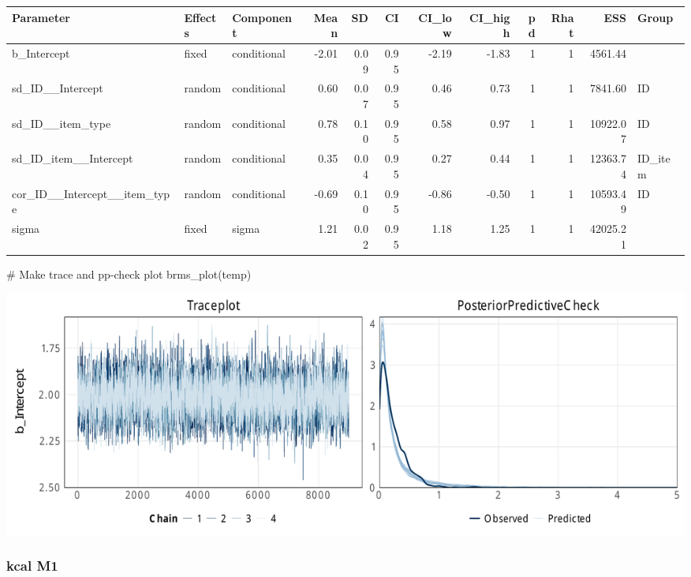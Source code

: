 \documentclass[
  letterpaper,
  DIV=11,
  numbers=noendperiod]{scrartcl}
\newenvironment{Shaded}{\begin{snugshade}}{\end{snugshade}}
\newcommand{\AttributeTok}[1]{\textcolor[rgb]{0.40,0.45,0.13}{#1}}
\newcommand{\CommentTok}[1]{\textcolor[rgb]{0.37,0.37,0.37}{#1}}
\newcommand{\FunctionTok}[1]{\textcolor[rgb]{0.28,0.35,0.67}{#1}}
\newcommand{\NormalTok}[1]{\textcolor[rgb]{0.00,0.23,0.31}{#1}}
\newcommand{\OtherTok}[1]{\textcolor[rgb]{0.00,0.23,0.31}{#1}}
\newcommand{\SpecialCharTok}[1]{\textcolor[rgb]{0.37,0.37,0.37}{#1}}
\newcommand{\StringTok}[1]{\textcolor[rgb]{0.13,0.47,0.30}{#1}}
\begin{document}
\begin{longtable*}[t]{lllrrrrrrrrl}
\toprule
Parameter & Effects & Component & Mean & SD & CI & CI\_low & CI\_high & pd & Rhat & ESS & Group\\
\midrule
b\_Intercept & fixed & conditional & -2.01 & 0.09 & 0.95 & -2.19 & -1.83 & 1 & 1 & 4561.44 & \\
sd\_ID\_\_Intercept & random & conditional & 0.60 & 0.07 & 0.95 & 0.46 & 0.73 & 1 & 1 & 7841.60 & ID\\
sd\_ID\_\_item\_type & random & conditional & 0.78 & 0.10 & 0.95 & 0.58 & 0.97 & 1 & 1 & 10922.07 & ID\\
sd\_ID\_item\_\_Intercept & random & conditional & 0.35 & 0.04 & 0.95 & 0.27 & 0.44 & 1 & 1 & 12363.74 & ID\_item\\
cor\_ID\_\_Intercept\_\_item\_type & random & conditional & -0.69 & 0.10 & 0.95 & -0.86 & -0.50 & 1 & 1 & 10593.49 & ID\\
\addlinespace
sigma & fixed & sigma & 1.21 & 0.02 & 0.95 & 1.18 & 1.25 & 1 & 1 & 42025.21 & \\
\bottomrule
\end{longtable*}

\begin{Shaded}
\begin{Highlighting}[]
\CommentTok{\# Make trace and pp{-}check plot}
\FunctionTok{brms\_plot}\NormalTok{(temp)}
\end{Highlighting}
\end{Shaded}

\includegraphics{supplement_files/figure-pdf/h2aM0kcal-1.pdf}

\subsubsection{kcal M1}\label{kcal-m1-2}

\begin{Shaded}
\end{Shaded}
\end{document}

